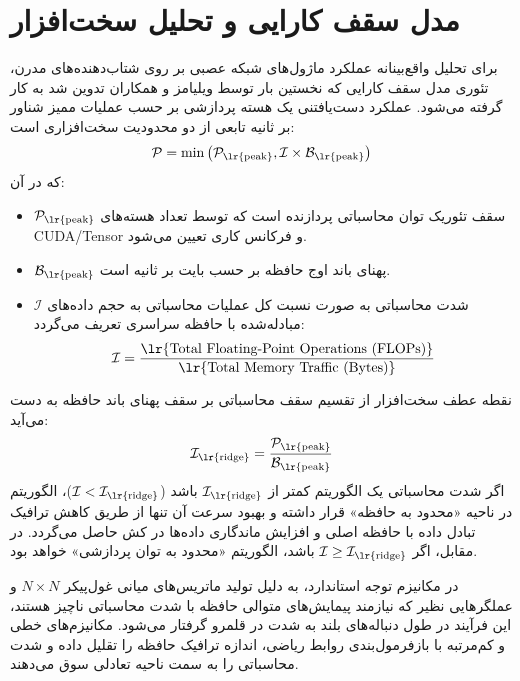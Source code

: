 \documentclass[12pt,a4paper]{report}
\theoremstyle{definition}
\begin{document}
\section{مدل سقف کارایی  و تحلیل سخت‌افزار}
برای تحلیل واقع‌بینانه عملکرد ماژول‌های شبکه عصبی بر روی شتاب‌دهنده‌های مدرن، تئوری مدل سقف کارایی  که نخستین بار توسط ویلیامز و همکاران تدوین شد \cite{williams2009roofline} به کار گرفته می‌شود. عملکرد دست‌یافتنی یک هسته پردازشی بر حسب عملیات ممیز شناور بر ثانیه  تابعی از دو محدودیت سخت‌افزاری است:
\begin{equation}
\mathcal{P} = \min \left( \mathcal{P}_{\text{\lr{peak}}}, \mathcal{I} \times \mathcal{B}_{\text{\lr{peak}}} \right)
\end{equation}
که در آن:
\begin{itemize}
    \item $\mathcal{P}_{\text{\lr{peak}}}$ سقف تئوریک توان محاسباتی پردازنده  است که توسط تعداد هسته‌های CUDA/Tensor و فرکانس کاری تعیین می‌شود.
    \item $\mathcal{B}_{\text{\lr{peak}}}$ پهنای باند اوج حافظه  بر حسب بایت بر ثانیه است.
    \item $\mathcal{I}$ شدت محاسباتی  به صورت نسبت کل عملیات محاسباتی به حجم داده‌های مبادله‌شده با حافظه سراسری تعریف می‌گردد:
    \begin{equation}
    \mathcal{I} = \frac{\text{\lr{Total Floating-Point Operations (FLOPs)}}}{\text{\lr{Total Memory Traffic (Bytes)}}}
    \end{equation}
\end{itemize}

نقطه عطف سخت‌افزار  از تقسیم سقف محاسباتی بر سقف پهنای باند حافظه به دست می‌آید:
\begin{equation}
\mathcal{I}_{\text{\lr{ridge}}} = \frac{\mathcal{P}_{\text{\lr{peak}}}}{\mathcal{B}_{\text{\lr{peak}}}}
\end{equation}
اگر شدت محاسباتی یک الگوریتم کمتر از $\mathcal{I}_{\text{\lr{ridge}}}$ باشد ($\mathcal{I} < \mathcal{I}_{\text{\lr{ridge}}}$)، الگوریتم در ناحیه «محدود به حافظه»  قرار داشته و بهبود سرعت آن تنها از طریق کاهش ترافیک تبادل داده با حافظه اصلی و افزایش ماندگاری داده‌ها در کش  حاصل می‌گردد. در مقابل، اگر $\mathcal{I} \ge \mathcal{I}_{\text{\lr{ridge}}}$ باشد، الگوریتم «محدود به توان پردازشی»  خواهد بود.

در مکانیزم توجه استاندارد، به دلیل تولید ماتریس‌های میانی غول‌پیکر $N \times N$ و عملگرهایی نظیر  که نیازمند پیمایش‌های متوالی حافظه با شدت محاسباتی ناچیز هستند، این فرآیند در طول دنباله‌های بلند به شدت در قلمرو  گرفتار می‌شود. مکانیزم‌های خطی و کم‌مرتبه با بازفرمول‌بندی روابط ریاضی، اندازه ترافیک حافظه را تقلیل داده و شدت محاسباتی را به سمت ناحیه تعادلی سوق می‌دهند.
\end{document}
